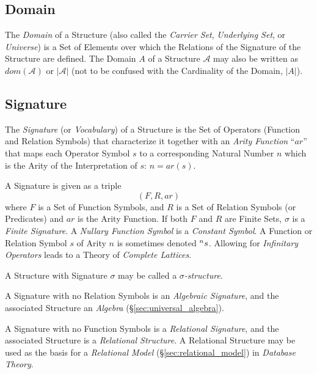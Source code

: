 \subsection{Domain}\label{sec:domain}

The \emph{Domain} of a Structure (also called the \emph{Carrier Set},
\emph{Underlying Set}, or \emph{Universe}) is a Set of Elements over
which the Relations of the Signature of the Structure are defined. The
Domain $A$ of a Structure $\mathcal{A}$ may also be written as
$dom(\mathcal{A})$ or $|\mathcal{A}|$ (not to be confused with the
Cardinality of the Domain, $|A|$).



\subsection{Signature}\label{sec:signature}

The \emph{Signature} (or \emph{Vocabulary}) of a Structure is the Set
of Operators (Function and Relation Symbols) that characterize it
together with an \emph{Arity Function} ``$ar$'' that maps each
Operator Symbol $s$ to a corresponding Natural Number $n$ which is the
Arity of the Interpretation of $s$: $n = ar(s)$.

A Signature is given as a triple
\[
    (F,R,ar)
\]
where $F$ is a Set of Function Symbols, and $R$ is a Set of Relation
Symbols (or Predicates) and $ar$ is the Arity Function. If both $F$
and $R$ are Finite Sets, $\sigma$ is a \emph{Finite Signature}. A
\emph{Nullary Function Symbol} is a \emph{Constant Symbol}. A Function
or Relation Symbol $s$ of Arity $n$ is sometimes denoted
$\prescript{n}{}{s}$. Allowing for \emph{Infinitary Operators} leads
to a Theory of \emph{Complete Lattices}.

A Structure with Signature $\sigma$ may be called a
\emph{$\sigma$-structure}.

A Signature with no Relation Symbols is an \emph{Algebraic
  Signature}, and the associated Structure an \emph{Algebra}
(\S\ref{sec:universal_algebra}).

A Signature with no Function Symbols is a \emph{Relational Signature},
and the associated Structure is a \emph{Relational Structure}. A
Relational Structure may be used as the basis for a \emph{Relational
  Model} (\S\ref{sec:relational_model}) in \emph{Database Theory}.

